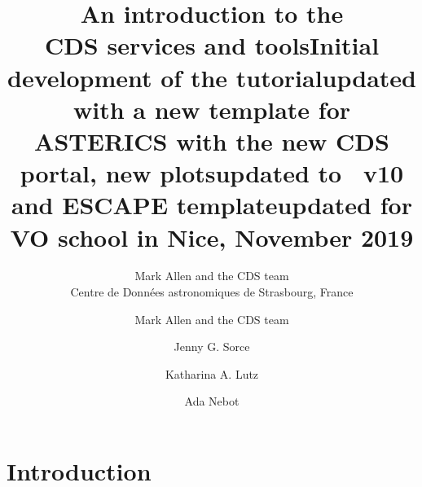 \documentclass [a4paper, 12pt]{article}
\begin{document}
\author{Mark Allen and the CDS team \\      %
Centre de Donn\'ees astronomiques de Strasbourg, France}       %
\title{An introduction to the \\ CDS services and tools}   %
\makeescapetitle

\newpage
\author{Mark Allen and the CDS team}   %
\title{Initial development of the tutorial}  %
\addescapehistory
\author{Jenny G. Sorce}
\title{updated with a new template for ASTERICS with the new CDS portal, new plots}
\addescapehistory
\author{Katharina A. Lutz}
\title{updated to \aladin\ v10 and ESCAPE template}
\addescapehistory
\author{Ada Nebot}
\title{updated for VO school in Nice, November 2019}
\addescapehistory

\newpage
\tableofcontents

\newpage
\section{Introduction}
\end{document}

